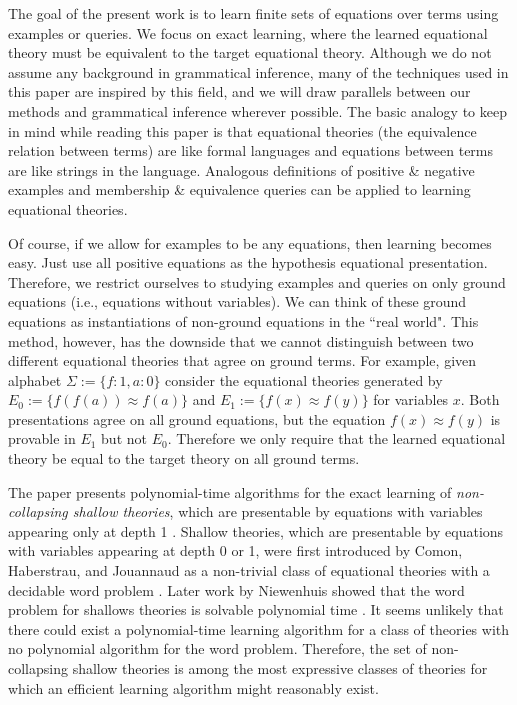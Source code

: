 The goal of the present work is to learn finite sets of equations over terms using examples or queries.
We focus on exact learning, where the learned equational theory must be equivalent to the target equational theory. %
Although we do not assume any background in grammatical inference, many of the techniques used in this paper are inspired by this field, and we will draw parallels between our methods and grammatical inference wherever possible.
The basic analogy to keep in mind while reading this paper is that equational theories (the equivalence relation between terms) are like formal languages and equations between terms are like strings in the language.
Analogous definitions of positive \& negative examples and membership \& equivalence queries can be applied to learning equational theories.

Of course, if we allow for examples to be any equations, then learning becomes easy. 
Just use all positive equations as the hypothesis equational presentation. %
Therefore, we restrict ourselves to studying examples and queries on only ground equations (i.e., equations without variables).
We can think of these ground equations as instantiations of non-ground equations in the ``real world". 
This method, however, has the downside that we cannot distinguish between two different equational theories that agree on ground terms.
For example, given alphabet $\Sigma := \{f:1, a:0\}$ %
consider the equational theories generated 
by $E_0 := \{ f(f(a)) \approx f(a)\}$ and $E_1 := \{ f(x) \approx f(y) \}$ for variables $x$. Both presentations agree on all ground equations, but the equation $f(x) \approx f(y)$ is provable in $E_1$ but not $E_0$. 
Therefore we only require that the learned equational theory be equal to the target theory on all ground terms.%

The paper presents polynomial-time algorithms for the exact learning of \emph{non-collapsing shallow theories}, which are presentable by equations with variables appearing only at depth 1 .
Shallow theories, which are presentable by equations with variables appearing at depth 0 or 1, were first introduced by Comon, Haberstrau, and Jouannaud as a non-trivial class of equational theories with a decidable word problem \citep{comon1992decidable, comon1994syntacticness}. 
Later work by Niewenhuis showed that the word problem for shallows theories is solvable polynomial time \citep{nieuwenhuis96}.
It seems unlikely that there could exist a polynomial-time learning algorithm for a class of theories with no polynomial algorithm for the word problem. 
Therefore, the set of non-collapsing shallow theories is among the most expressive classes of theories for which an efficient learning algorithm might reasonably exist. 

